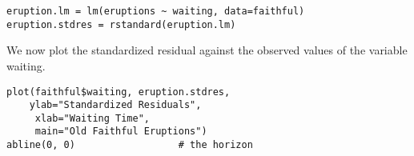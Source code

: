 \documentclass[residuals.tex]{subfiles}
\begin{document}
\begin{framed}
\begin{verbatim}
eruption.lm = lm(eruptions ~ waiting, data=faithful) 
eruption.stdres = rstandard(eruption.lm) 
\end{verbatim}
\end{framed}
We now plot the standardized residual against the observed values of the variable waiting.
\begin{framed}
\begin{verbatim}
plot(faithful$waiting, eruption.stdres, 
    ylab="Standardized Residuals", 
     xlab="Waiting Time", 
     main="Old Faithful Eruptions") 
abline(0, 0)                  # the horizon
\end{verbatim}
\end{framed}
\end{document}
